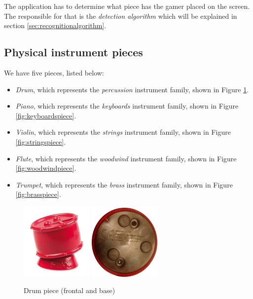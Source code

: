 The application has to determine what piece has the gamer placed on the screen. The responsible for that is the \textit{detection algorithm} which will be explained in section \ref{sec:recognitionalgorithm}.

\subsection{Physical instrument pieces}
\label{sec:piecesdetailed}
We have five pieces, listed below:
\begin{itemize}
\item \textit{Drum}, which represents the \textit{percussion} instrument family, shown in Figure \ref{fig:percussionpiece}.
\item \textit{Piano}, which represents the \textit{keyboards} instrument family, shown in Figure \ref{fig:keyboardspiece}.
\item \textit{Violin}, which represents the \textit{strings} instrument family, shown in Figure \ref{fig:stringspiece}.
\item \textit{Flute}, which represents the \textit{woodwind} instrument family, shown in Figure \ref{fig:woodwindpiece}.
\item \textit{Trumpet}, which represents the \textit{brass} instrument family, shown in Figure \ref{fig:brasspiece}.
\end{itemize}

\begin{figure}[ht!]
	\centering
	\includegraphics[width=100pt]{graphics/architecture/pieces/piecePercussion.jpg}
	\vspace{0.6cm}
	\includegraphics[width=100pt]{graphics/architecture/pieces/percussionBase.png}
	\caption{Drum piece (frontal and base)}
	\label{fig:percussionpiece}
\end{figure}

